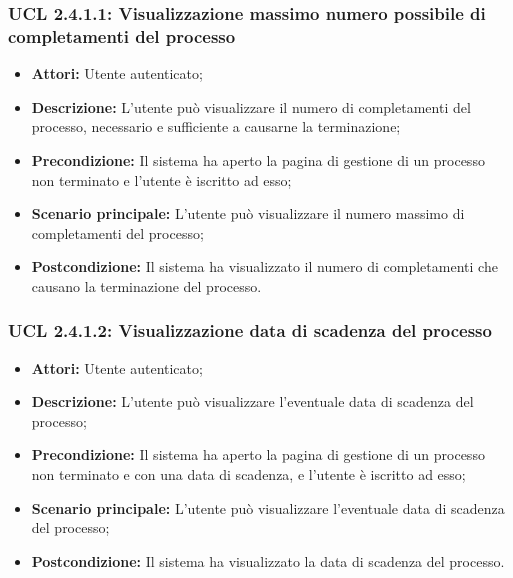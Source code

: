 \hypertarget{L2.4.1.1}{}
\subsubsection{UCL 2.4.1.1: Visualizzazione massimo numero possibile di completamenti del processo}
\begin{itemize}
\item \textbf{Attori:} Utente autenticato;
\item \textbf{Descrizione:} L'utente può visualizzare il numero di completamenti del processo, necessario e sufficiente a causarne la terminazione;
\item \textbf{Precondizione:} Il sistema ha aperto la pagina di gestione di un processo non terminato e l'utente è iscritto ad esso;
\item \textbf{Scenario principale:}  L'utente può visualizzare il numero massimo di completamenti del processo;
\item \textbf{Postcondizione:} Il sistema ha visualizzato il numero di completamenti che causano la terminazione del processo.
\end{itemize}

\hypertarget{L2.4.1.2}{}
\subsubsection{UCL 2.4.1.2: Visualizzazione data di scadenza del processo}
\begin{itemize}
\item \textbf{Attori:} Utente autenticato;
\item \textbf{Descrizione:} L'utente può visualizzare l'eventuale data di scadenza del processo;
\item \textbf{Precondizione:} Il sistema ha aperto la pagina di gestione di un processo  non terminato e con una data di scadenza, e l'utente è iscritto ad esso;
\item \textbf{Scenario principale:} L'utente può visualizzare l'eventuale data di scadenza del processo;
\item \textbf{Postcondizione:} Il sistema ha visualizzato la data di scadenza del processo.
\end{itemize}

